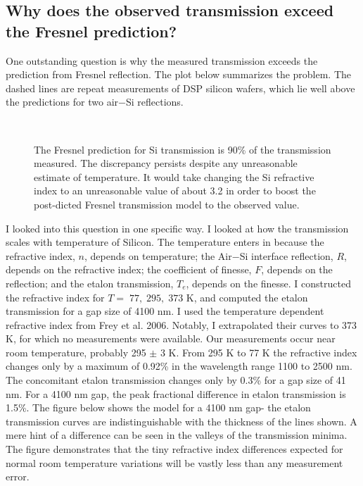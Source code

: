 \subsection{Why does the observed transmission exceed the Fresnel prediction?}

One outstanding question is why the measured transmission exceeds the prediction from Fresnel reflection.  The plot below summarizes the problem.  The dashed lines are repeat measurements of DSP silicon wafers, which lie well above the predictions for two air$-$Si reflections.


\begin{figure}[h!] 
\begin{center}
\ 
\caption[Fresnel prediction]{The Fresnel prediction for Si transmission is 90\% of the transmission measured.  The discrepancy persists despite any unreasonable estimate of temperature.  It would take changing the Si refractive index to an unreasonable value of about 3.2 in order to boost the post-dicted Fresnel transmission model to the observed value.}
\label{fig:Fresneldiscrepancy}
\end{center}
\end{figure}


I looked into this question in one specific way.  I looked at how the transmission scales with temperature of Silicon.  The temperature enters in because the refractive index, $n$, depends on temperature; the Air$-$Si interface reflection, $R$, depends on the refractive index; the coefficient of finesse, $F$, depends on the reflection; and the etalon transmission, $T_e$, depends on the finesse.  I constructed the refractive index for $T=\;77, \;295, \;373$ K, and computed the etalon transmission for a gap size of 4100 nm.  I used the temperature dependent refractive index from Frey et al. 2006.  Notably, I extrapolated their curves to 373 K, for which no measurements were available.  Our measurements occur near room temperature, probably 295 $\pm$ 3 K.  From 295 K to 77 K the refractive index changes only by a maximum of 0.92\% in the wavelength range 1100 to 2500 nm.  The concomitant etalon transmission changes only by 0.3\% for a gap size of 41 nm.  For a 4100 nm gap, the peak fractional difference in etalon transmission is 1.5\%.  The figure below shows the model for a 4100 nm gap- the etalon transmission curves are indistinguishable with the thickness of the lines shown.  A mere hint of a difference can be seen in the valleys of the transmission minima.  The figure demonstrates that the tiny refractive index differences expected for normal room temperature variations will be vastly less than any measurement error.


